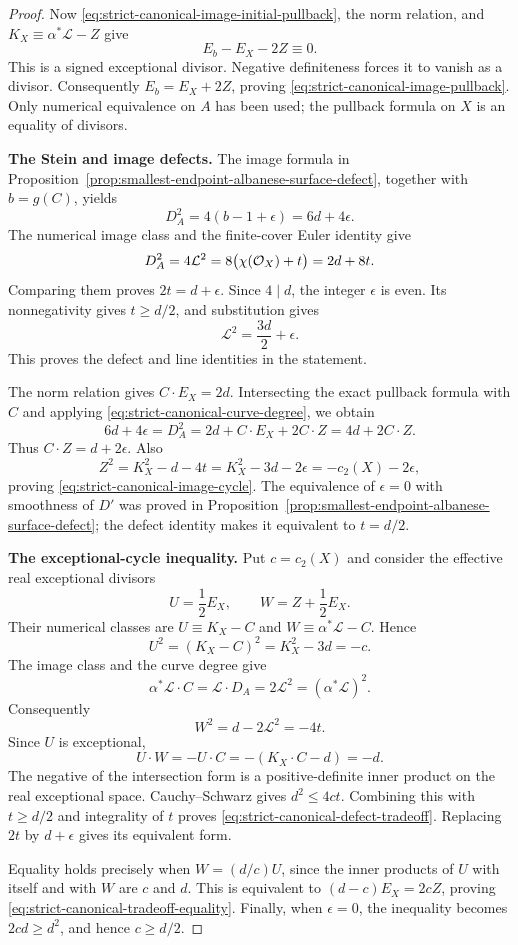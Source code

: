 \begin{proof}
Now \eqref{eq:strict-canonical-image-initial-pullback}, the norm
relation, and $K_X\equiv\alpha^*\mathcal L-Z$ give
\[
 E_b-E_X-2Z\equiv0.
\]
This is a signed exceptional divisor.
Negative definiteness forces it to vanish as a divisor.
Consequently $E_b=E_X+2Z$, proving
\eqref{eq:strict-canonical-image-pullback}.
Only numerical equivalence on $A$ has been used; the pullback
formula on $X$ is an equality of divisors.

\par\smallskip\noindent\textbf{The Stein and image defects.}
The image formula in
Proposition~\ref{prop:smallest-endpoint-albanese-surface-defect},
together with $b=g(C)$, yields
\[
 D_A^2=4(b-1+\epsilon)=6d+4\epsilon.
\]
The numerical image class and the finite-cover Euler identity give
\[
 D_A^2=4\mathcal L^2
       =8\bigl(\chi(\mathcal O_X)+t\bigr)=2d+8t.
\]
Comparing them proves $2t=d+\epsilon$.
Since $4\mid d$, the integer $\epsilon$ is even.
Its nonnegativity gives $t\ge d/2$, and substitution gives
\[
 \mathcal L^2=\frac{3d}{2}+\epsilon.
\]
This proves the defect and line identities in the statement.

The norm relation gives $C\cdot E_X=2d$.
Intersecting the exact pullback formula with $C$ and applying
\eqref{eq:strict-canonical-curve-degree}, we obtain
\[
 6d+4\epsilon=D_A^2
 =2d+C\cdot E_X+2C\cdot Z=4d+2C\cdot Z.
\]
Thus $C\cdot Z=d+2\epsilon$.
Also
\[
 Z^2=K_X^2-d-4t
    =K_X^2-3d-2\epsilon=-c_2(X)-2\epsilon,
\]
proving \eqref{eq:strict-canonical-image-cycle}.
The equivalence of $\epsilon=0$ with smoothness of $D'$ was
proved in Proposition~\ref{prop:smallest-endpoint-albanese-surface-defect};
the defect identity makes it equivalent to $t=d/2$.

\par\smallskip\noindent\textbf{The exceptional-cycle inequality.}
Put $c=c_2(X)$ and consider the effective real exceptional divisors
\[
 U=\frac12E_X,\qquad W=Z+\frac12E_X.
\]
Their numerical classes are $U\equiv K_X-C$ and
$W\equiv\alpha^*\mathcal L-C$.
Hence
\[
 U^2=(K_X-C)^2=K_X^2-3d=-c.
\]
The image class and the curve degree give
\[
 \alpha^*\mathcal L\cdot C
 =\mathcal L\cdot D_A
 =2\mathcal L^2=(\alpha^*\mathcal L)^2.
\]
Consequently
\[
 W^2=d-2\mathcal L^2=-4t.
\]
Since $U$ is exceptional,
\[
 U\cdot W=-U\cdot C=-(K_X\cdot C-d)=-d.
\]
The negative of the intersection form is a positive-definite inner
product on the real exceptional space.
Cauchy--Schwarz gives $d^2\le4ct$.
Combining this with $t\ge d/2$ and integrality of $t$ proves
\eqref{eq:strict-canonical-defect-tradeoff}.
Replacing $2t$ by $d+\epsilon$ gives its equivalent form.

Equality holds precisely when $W=(d/c)U$, since the inner
products of $U$ with itself and with $W$ are $c$ and $d$.
This is equivalent to $(d-c)E_X=2cZ$, proving
\eqref{eq:strict-canonical-tradeoff-equality}.
Finally, when $\epsilon=0$, the inequality becomes
$2cd\ge d^2$, and hence $c\ge d/2$.
\end{proof}

